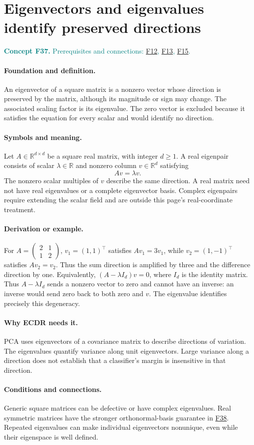 \documentclass[11pt,a4paper]{article}
\newcommand{\R}{\mathbb R}
\newcommand{\conceptid}{Front matter}
\newcommand{\concept}[3]{\clearpage\renewcommand{\conceptid}{#1}%
\section{#2}\label{concept:#1}%
\textcolor{teal}{\textbf{Concept #1.} Prerequisites and connections: #3.}\par
\typeout{ECDR-CONCEPT-START #1 PAGE=\thepage}}
\begin{document}
\concept{F37}{Eigenvectors and eigenvalues identify preserved directions}{\hyperref[concept:F12]{F12}, \hyperref[concept:F13]{F13}, \hyperref[concept:F15]{F15}}
\paragraph{Foundation and definition.}
An eigenvector of a square matrix is a nonzero vector whose direction
is preserved by the matrix, although its magnitude or sign may change.
The associated scaling factor is its eigenvalue. The zero vector is
excluded because it satisfies the equation for every scalar and would
identify no direction.
\paragraph{Symbols and meaning.}
Let $A\in\R^{d\times d}$ be a square real matrix, with integer
$d\ge1$. A real eigenpair consists of scalar $\lambda\in\R$ and
nonzero column $v\in\R^d$ satisfying
\[
 Av=\lambda v.
\]
The nonzero scalar multiples of $v$ describe the same direction. A real
matrix need not have real eigenvalues or a complete eigenvector basis.
Complex eigenpairs require extending the scalar field and are outside
this page's real-coordinate treatment.
\paragraph{Derivation or example.}
For $A=\begin{pmatrix}2&1\\1&2\end{pmatrix}$,
$v_1=(1,1)^\top$ satisfies $Av_1=3v_1$, while
$v_2=(1,-1)^\top$ satisfies $Av_2=v_2$. Thus the sum direction is
amplified by three and the difference direction by one.
Equivalently, $(A-\lambda I_d)v=0$, where $I_d$ is the identity
matrix. Thus $A-\lambda I_d$ sends a nonzero vector to zero and
cannot have an inverse: an inverse would send zero back to both zero
and $v$. The eigenvalue identifies precisely this degeneracy.
\paragraph{Why ECDR needs it.}
PCA uses eigenvectors of a covariance matrix to describe directions of
variation. The eigenvalues quantify variance along unit eigenvectors.
Large variance along a direction does not establish that a classifier's
margin is insensitive in that direction.
\paragraph{Conditions and connections.}
Generic square matrices can be defective or have complex eigenvalues.
Real symmetric matrices have the stronger orthonormal-basis guarantee
in \hyperref[concept:F38]{F38}. Repeated eigenvalues can make individual eigenvectors
nonunique, even while their eigenspace is well defined.
\par\label{endconcept:F37}
\end{document}
